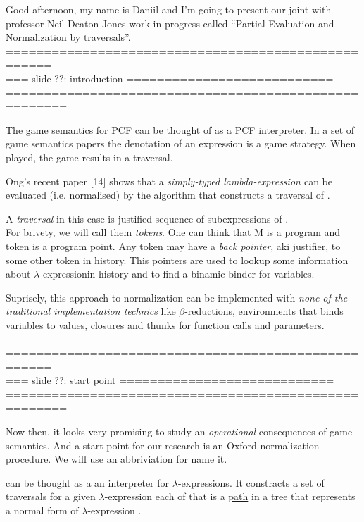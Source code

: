 \documentclass[a4paper, 10pt]{article} %
\newcommand{\red}[1]{{\color{red}#1}}
\newcommand{\green}[1]{{\color{blue!20!black!30!green}#1}}
\newcommand{\blue}[1]{{\color{blue}#1}}
\newcommand{\lam}[1]{{\color{brown}\textit{\boldmath{#1}}}}
\newcommand{\lexp}{$\lambda$-expression}
\begin{document}
Good afternoon, my name is Daniil and I'm going to present our joint with professor Neil Deaton Jones work in progress called ``Partial Evaluation and Normalization by traversals''. \\


====================================================\\
=== slide ??: introduction ===========================\\
======================================================

The game semantics for PCF can be thought of as a PCF interpreter.
In a set of game semantics papers the denotation of an expression is a game strategy. When played, the game results in a traversal.

Ong’s recent paper [14] shows that a \blue{\textit{simply-typed lambda-expression \lam{M}}} can be \red{evaluated} (i.e. normalised) by the algorithm that constructs a \green{traversal} of \lam{M}.

A \green{\textit{traversal}} in this case is justified sequence of subexpressions of \lam{M}.\\
For brivety, we will call them \green{\textit{tokens}}.
  One can think that M is a \blue{program} and token is a \blue{program point}.
Any token may have a \green{\textit{back pointer}}, aki justifier, to some other token in history. This pointers are used to lookup some information about \lexp in history and to find a binamic binder for variables.

Suprisely, this approach to normalization can be implemented with \textit{\blue{none of} the traditional implementation technics}
like $\beta$-reductions, environments that binds variables to values, closures and thunks for function calls and parameters.
\\\\



====================================================\\
=== slide ??: start point ============================\\
======================================================

Now then, it looks very promising to study an \textit{operational} consequences of game semantics. And a start point for our research is an Oxford normalization procedure. We will use an abbriviation \lam{ONP} for name it.

\lam{ONP} can be thought as a \green{an interpreter for {\lexp}s}.
It constracts a set of traversals \lam{$\mathfrak{Trav}(M)$} for a given \lexp \lam{$M$} each of that is a \underline{path} in a tree that represents a normal form of $\lambda$-expression \lam{M}.
\end{document}
